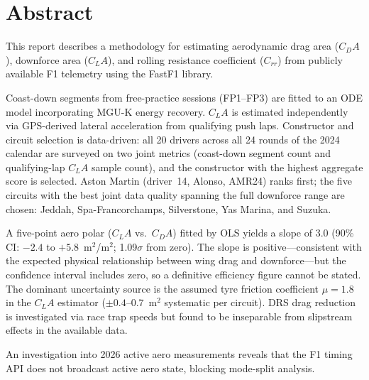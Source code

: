 \section*{Abstract}
This report describes a methodology for estimating aerodynamic drag area ($C_DA$), downforce area ($C_LA$), and rolling resistance coefficient ($C_{rr}$) from publicly available F1 telemetry using the FastF1 library.

Coast-down segments from free-practice sessions (FP1--FP3) are fitted to an ODE model incorporating MGU-K energy recovery. $C_LA$ is estimated independently via GPS-derived lateral acceleration from qualifying push laps. Constructor and circuit selection is data-driven: all 20 drivers across all 24 rounds of the 2024 calendar are surveyed on two joint metrics (coast-down segment count and qualifying-lap $C_LA$ sample count), and the constructor with the highest aggregate score is selected. Aston Martin (driver~14, Alonso, AMR24) ranks first; the five circuits with the best joint data quality spanning the full downforce range are chosen: Jeddah, Spa-Francorchamps, Silverstone, Yas Marina, and Suzuka.

A five-point aero polar ($C_LA$ vs.\ $C_DA$) fitted by OLS yields a slope of $3.0$ (90\% CI: $-2.4$ to $+5.8$~m$^2$/m$^2$; 1.09$\sigma$ from zero). The slope is positive---consistent with the expected physical relationship between wing drag and downforce---but the confidence interval includes zero, so a definitive efficiency figure cannot be stated. The dominant uncertainty source is the assumed tyre friction coefficient $\mu = 1.8$ in the $C_LA$ estimator ($\pm0.4$--$0.7$~m$^2$ systematic per circuit). DRS drag reduction is investigated via race trap speeds but found to be inseparable from slipstream effects in the available data.

An investigation into 2026 active aero measurements reveals that the F1 timing API does not broadcast active aero state, blocking mode-split analysis.
